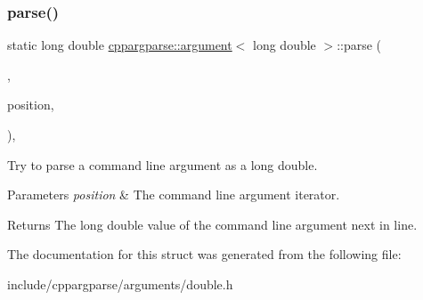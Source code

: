 \subsubsection{\texorpdfstring{parse()}{parse()}}
{\footnotesize\ttfamily static long double \hyperlink{structcppargparse_1_1argument}{cppargparse\+::argument}$<$ long double $>$\+::parse (\begin{DoxyParamCaption}\item[{const \hyperlink{types_8h_a80adf2418b7ce9fe616698efa7533ecf}{types\+::\+Command\+Line\+\_\+t} \&}]{,  }\item[{const \hyperlink{types_8h_a43b4f43f8940de1bf09ced6f1b668053}{types\+::\+Command\+Line\+Position\+\_\+t} \&}]{position,  }\item[{const \hyperlink{types_8h_a003c660afe2ee9c6cc39aea966e8926d}{types\+::\+Command\+Line\+Arguments\+\_\+t} \&}]{ }\end{DoxyParamCaption})\hspace{0.3cm}{\ttfamily [inline]}, {\ttfamily [static]}}



Try to parse a command line argument as a long double. 


\begin{DoxyParams}{Parameters}
{\em position} & The command line argument iterator.\\
\hline
\end{DoxyParams}
\begin{DoxyReturn}{Returns}
The long double value of the command line argument next in line. 
\end{DoxyReturn}


The documentation for this struct was generated from the following file\+:\begin{DoxyCompactItemize}
\item 
include/cppargparse/arguments/double.\+h\end{DoxyCompactItemize}
